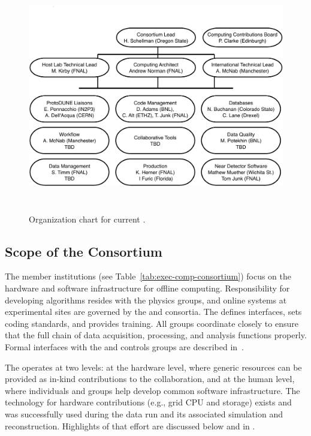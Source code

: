 \begin{figure}[htp]
\centering
\includegraphics[height=4in]{graphics/comp-org-chart.pdf}
\caption[Organization chart for current ]{Organization chart for current . }
\label{fig:ch-exec-comp-org-es}
\end{figure}

\subsection{Scope of the Consortium}
\label{ch:exec-comp-gov-scope}

The  member institutions (see Table~\ref{tab:exec-comp-consortium}) focus on the hardware and software infrastructure for offline computing.  Responsibility for developing algorithms resides %
with the physics groups, %
and online systems at experimental sites are governed by the  and  consortia. 
The  defines interfaces, sets coding standards, and provides training. %
All groups coordinate closely to ensure that the full chain of data acquisition, processing, and analysis %
functions properly. Formal interfaces with the  and controls groups are described in~\cite{bib:docdb7123,bib:docdb7126}. %

The  operates at two levels: at the hardware level, where generic resources can be provided as in-kind contributions to the collaboration, and at the human level, where individuals and groups help develop common software infrastructure.  The technology for hardware contributions (e.g., grid CPU and storage) exists and was successfully used during the  data run and its associated %
simulation and reconstruction. Highlights of that effort are discussed below and in \physchtools{}. %

